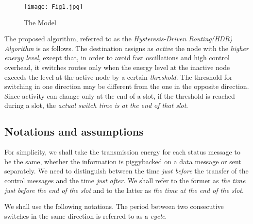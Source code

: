\documentclass[12 pt]{article}
\newcommand{\debug}[1]{\mbox{\tt #1}}
\renewcommand{\debug}[1]{}              \newcommand{\cmd}[1]{}
\newcommand{\msubsection}[2]{\subsection[#1 \debug{\fbox {#2}}]
	{#1 \cmd{msubsection} \dlabelx{#2}}\markboth{\today}{Sec. \thesection}}
\begin{document}
\begin{figure}[hbtp]
\begin{center}
\texttt{[image: Fig1.jpg]}
\caption{The Model\debug{\fbox{fig-Model}}\label{fig-Model}}
\end{center}
\end{figure}

The proposed algorithm, referred to as the \emph{Hysteresis-Driven Routing(HDR) Algorithm} is as follows.  The destination assigns as \emph{active} the node with the \emph{higher energy level}, except that, in order to avoid fast oscillations and high control overhead, it switches routes only when the energy level at the inactive node exceeds the level at the active node by a certain \emph{threshold}.  The threshold for switching in one direction may be different from the one in the opposite direction.  Since activity can change only at the end of a slot, if the threshold is reached during a slot, the \emph{actual switch time is at the end of that slot}.

\msubsection{Notations and assumptions}{notations}

For simplicity, we shall take the transmission energy for each status message to be the same, whether the information is piggybacked on a data message or sent separately.  We need to distinguish between the time \emph{just before} the transfer of the control messages and the time \emph{just after}.  We shall refer to the former as \emph{the time just before the end of the slot} and to the latter as \emph{the time at the end of the slot}.


We shall use the following notations.  The period between two consecutive switches in the same direction is referred to as a \emph{cycle}.
\end{document}
